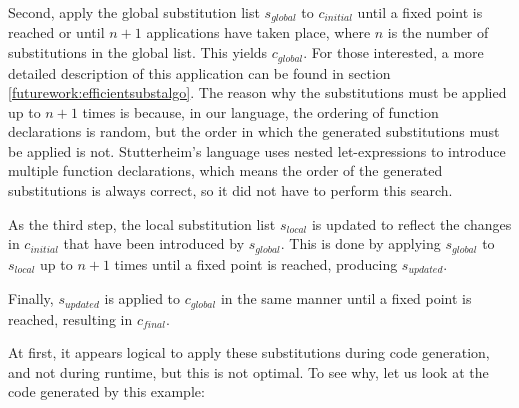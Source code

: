 \documentclass[10pt]{report}
\begin{document}
{Second, apply the global substitution list $s_{global}$ to $c_{initial}$ until a fixed point is reached or until $n+1$ applications have taken place, where $n$ is the number of substitutions in the global list. 
This yields $c_{global}$.
For those interested, a more detailed description of this application can be found in section \ref{futurework:efficientsubstalgo}.
The reason why the substitutions must be applied up to $n+1$ times is because, in our language, the ordering of function declarations is random, but the order in which the generated substitutions must be applied is not.
Stutterheim's language uses nested let-expressions to introduce multiple function declarations, which means the order of the generated substitutions is always correct, so it did not have to perform this search.

As the third step, the local substitution list $s_{local}$ is updated to reflect the changes in $c_{initial}$ that have been introduced by $s_{global}$.
This is done by applying $s_{global}$ to $s_{local}$ up to $n+1$ times until a fixed point is reached, producing $s_{updated}$.

Finally, $s_{updated}$ is applied to $c_{global}$ in the same manner until a fixed point is reached, resulting in $c_{final}$.



%

At first, it appears logical to apply these substitutions during code generation, and not during runtime, but this is not optimal.
To see why, let us look at the code generated by this example:

}
\end{document}
